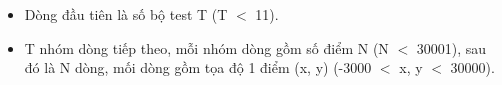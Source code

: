\begin{itemize}
	\item     Dòng đầu tiên là số bộ test T (T $<$ 11).   
	\item     T nhóm dòng tiếp theo, mỗi nhóm dòng gồm số điểm N (N $<$ 30001), sau đó là N dòng, mối dòng gồm tọa độ 1 điểm (x, y) (-3000 $<$ x, y $<$ 30000).   
\end{itemize}